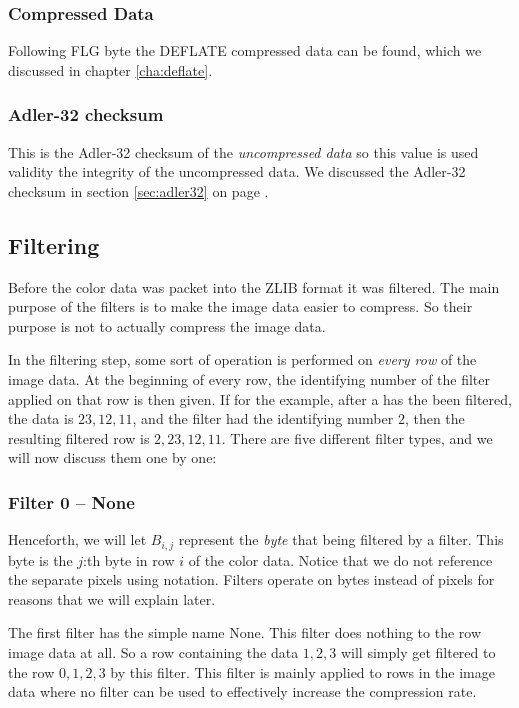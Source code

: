\subsubsection{Compressed Data}

Following FLG byte the DEFLATE compressed data can be found, which we
discussed in chapter \ref{cha:deflate}.

\subsubsection{Adler-32 checksum}

This is the Adler-32 checksum of the \textit{uncompressed data} so
this value is used validity the integrity of the uncompressed data. We
discussed the Adler-32 checksum in section \ref{sec:adler32} on page
\pageref{sec:adler32}.

\subsection{Filtering}
\label{sec:png-filters}

Before the color data was packet into the ZLIB format it was
filtered. The main purpose of the filters is to make the image data
easier to compress. So their purpose is not to actually compress the
image data.

In the filtering step, some sort of operation is performed on
\textit{every row} of the image data. At the beginning of every row,
the identifying number of the filter applied on that row is then
given. If for the example, after a has the been filtered, the data is
$23,12,11$, and the filter had the identifying number $2$, then the
resulting filtered row is $2,23,12,11$. There are five different
filter types, and we will now discuss them one by one:

\subsubsection{Filter 0 -- None}

Henceforth, we will let $B_{i,j}$ represent the \textit{byte} that
being filtered by a filter. This byte is the $j$:th byte in row $i$ of
the color data. Notice that we do not reference the separate pixels
using notation. Filters operate on bytes instead of pixels for reasons
that we will explain later.



The first filter has the simple name None. This filter does nothing to
the row image data at all. So a row containing the data $1,2,3$ will
simply get filtered to the row $0,1,2,3$ by this filter. This filter
is mainly applied to rows in the image data where no filter can be
used to effectively increase the compression rate.

